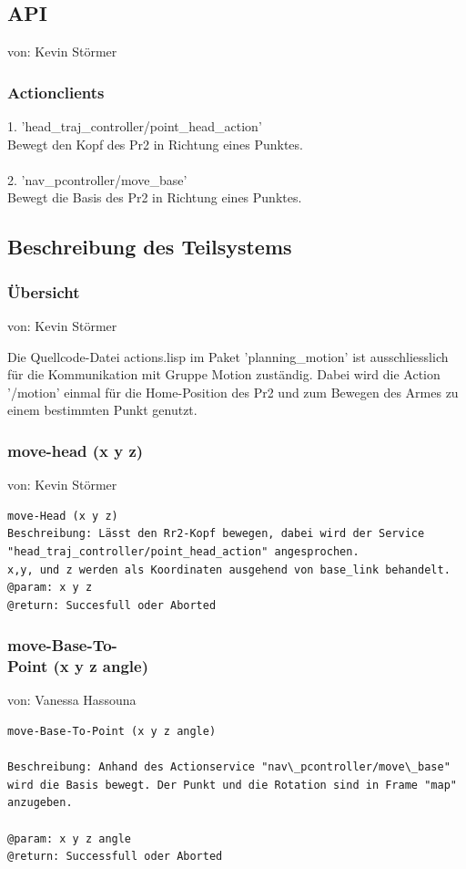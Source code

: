 \documentclass{suturo}
\makeatletter
\newcommand{\chapterauthor}[1]{%
  {\parindent0pt\vspace*{-27pt}%
  \linespread{0}\small\begin{flushright}von: #1\end{flushright}%
  \par\nobreak\vspace*{0pt}}
  \@afterheading%
}
\makeatother
\begin{document}
\subsection{API}
\chapterauthor{Kevin Störmer}
\subsubsection{Actionclients}
1. 'head\_traj\_controller/point\_head\_action' \\
Bewegt den Kopf des Pr2 in Richtung eines Punktes.\\ \\
2. 'nav\_pcontroller/move\_base' \\
Bewegt die Basis des Pr2 in Richtung eines Punktes.
\subsection{Beschreibung des Teilsystems}

\subsubsection{\"Ubersicht}
\chapterauthor{Kevin Störmer}
Die Quellcode-Datei actions.lisp im Paket 'planning\_motion'  ist ausschliesslich für die Kommunikation mit Gruppe Motion zuständig. Dabei wird die Action '/motion' einmal für die Home-Position des Pr2 und zum Bewegen des Armes zu einem bestimmten Punkt genutzt.



\subsubsection{move-head (x y z)}
\chapterauthor{Kevin Störmer}

\begin{verbatim}
move-Head (x y z)
Beschreibung: Lässt den Rr2-Kopf bewegen, dabei wird der Service 
"head_traj_controller/point_head_action" angesprochen.
x,y, und z werden als Koordinaten ausgehend von base_link behandelt.
@param: x y z
@return: Succesfull oder Aborted
\end{verbatim}



\subsubsection{move-Base-To-\\
Point (x y z angle)}
\chapterauthor{Vanessa Hassouna}
\begin{verbatim}
move-Base-To-Point (x y z angle)

Beschreibung: Anhand des Actionservice "nav\_pcontroller/move\_base" 
wird die Basis bewegt. Der Punkt und die Rotation sind in Frame "map" anzugeben.

@param: x y z angle
@return: Successfull oder Aborted
\end{verbatim}
\end{document}
